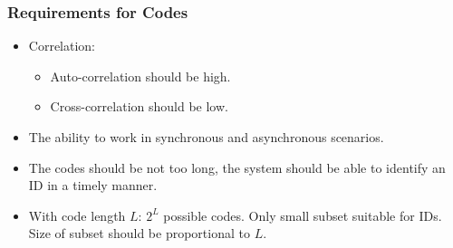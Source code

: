 \documentclass{beamer}
\begin{document}
	\begin{frame}\frametitle{Requirements for Codes}
		
		\begin{itemize}

			\item Correlation:
			\begin{itemize}

				\item Auto-correlation should be high.

				\item Cross-correlation should be low.

			\end{itemize}

			\item The ability to work in synchronous and asynchronous scenarios.

			\item The codes should be not too long, the system should be able to identify an ID in a timely manner.

			\item With code length $L$: $2^L$ possible codes. Only small subset suitable for IDs. Size of subset should be proportional to $L$.

		\end{itemize}
		
	\end{frame}
\end{document}

